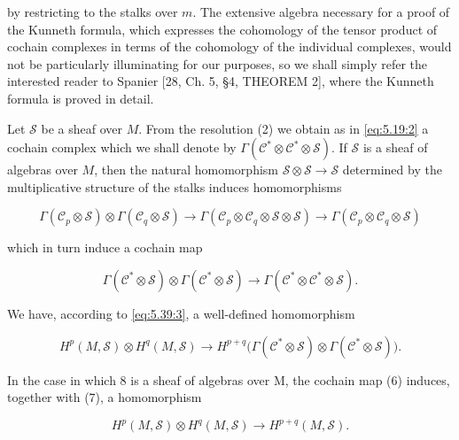 by restricting to the stalks over $m$. The extensive algebra necessary for a proof of the Kunneth formula, which expresses the cohomology of the tensor product of cochain complexes in terms of the cohomology of the individual complexes, would not be particularly illuminating for our purposes, so we shall simply refer the interested reader to Spanier [28, Ch. 5, §4, THEOREM 2], where the Kunneth formula is proved in detail.

Let $\mathcal{S}$ be a sheaf over $M$. From the resolution (2) we obtain as in \eqref{eq:5.19:2} a cochain complex which we shall denote by $\Gamma(\mathcal{C}^*\otimes\mathcal{C}^*\otimes\mathcal{S})$. If $\mathcal{S}$ is a sheaf of algebras over $M$, then the natural homomorphism $\mathcal{S}\otimes\mathcal{S}\to\mathcal{S}$ determined by the multiplicative structure of the stalks induces homomorphisms

\begin{equation}
\tag{5}\label{eq:5.42:5}
\Gamma(\mathcal{C}_{p}\otimes\mathcal{S})\otimes\Gamma(\mathcal{C}_{{q}}\otimes\mathcal{S})\to\Gamma(\mathcal{C}_{{p}}\otimes\mathcal{C}_{{q}}\otimes\mathcal{S}\otimes\mathcal{S})\to\Gamma(\mathcal{C}_{{p}}\otimes\mathcal{C}_{{q}}\otimes\mathcal{S})
\end{equation}

which in turn induce a cochain map

\begin{equation}
\tag{6}\label{eq:5.42:6}
\Gamma(\mathcal{C}^{*}\otimes\mathcal{S})\otimes\Gamma(\mathcal{C}^{*}\otimes\mathcal{S})\to\Gamma(\mathcal{C}^{*}\otimes\mathcal{C}^{*}\otimes\mathcal{S}).
\end{equation}

We have, according to \eqref{eq:5.39:3}, a well-defined homomorphism

\begin{equation}
\tag{7}\label{eq:5.42:7}
H^{p}(M,\mathcal{S})\otimes H^{q}(M,\mathcal{S})\to H^{p+q}\big(\Gamma(\mathcal{C}^{*}\otimes\mathcal{S})\otimes\Gamma(\mathcal{C}^{*}\otimes\mathcal{S})\big).
\end{equation}

In the case in which 8 is a sheaf of algebras over M, the cochain map (6) induces, together with (7), a homomorphism

\begin{equation}
\tag{8}\label{eq:5.42:8}
H^{p}(M,\mathcal{S})\otimes H^{q}(M,\mathcal{S})\to H^{p+q}(M,\mathcal{S}).
\end{equation}

